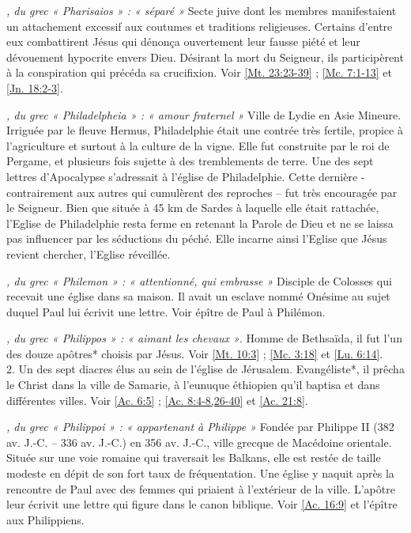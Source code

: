 \begin{multicols}{2}
\textit{, du grec « Pharisaios » : « séparé »}\newline
Secte juive dont les membres manifestaient un attachement excessif aux coutumes et traditions religieuses. Certains d'entre eux combattirent Jésus qui dénonça ouvertement leur fausse piété et leur dévouement hypocrite envers Dieu. Désirant la mort du Seigneur, ils participèrent à la conspiration qui précéda sa crucifixion. Voir \vref{Mt. 23:23-39} ; \vref{Mc. 7:1-13} et \vref{Jn. 18:2-3}.

\textit{, du grec « Philadelpheia » : « amour fraternel »}\newline
Ville de Lydie en Asie Mineure. Irriguée par le fleuve Hermus, Philadelphie était une contrée très fertile, propice à l'agriculture et surtout à la culture de la vigne. Elle fut construite par le roi de Pergame, et plusieurs fois sujette à des tremblements de terre. Une des sept lettres d'Apocalypse s'adressait à l'église de Philadelphie. Cette dernière - contrairement aux autres qui cumulèrent des reproches – fut très encouragée par le Seigneur. Bien que située à 45 km de Sardes à laquelle elle était rattachée, l'Eglise de Philadelphie resta ferme en retenant la Parole de Dieu et ne se laissa pas influencer par les séductions du péché. Elle incarne ainsi l'Eglise que Jésus revient chercher, l'Eglise réveillée.

\textit{, du grec « Philemon » : « attentionné, qui embrasse »}\newline
Disciple de Colosses qui recevait une église dans sa maison. Il avait un esclave nommé Onésime au sujet duquel Paul lui écrivit une lettre. Voir épître de Paul à Philémon.

\textit{, du grec « Philippos » : « aimant les chevaux »}. Homme de Bethsaïda, il fut l'un des douze apôtres* choisis par Jésus. Voir \vref{Mt. 10:3} ; \vref{Mc. 3:18} et \vref{Lu. 6:14}.
\\2. Un des sept diacres élus au sein de l'église de Jérusalem. Evangéliste*, il prêcha le Christ dans la ville de Samarie, à l'eunuque éthiopien qu'il baptisa et dans différentes villes. Voir \vref{Ac. 6:5} ; \vref{Ac. 8:4-8,26-40} et \vref{Ac. 21:8}.

\textit{, du grec « Philippoi » : « appartenant à Philippe »}\newline
Fondée par Philippe II (382 av. J.-C. – 336 av. J.-C.) en 356 av. J.-C., ville grecque de Macédoine orientale. Située sur une voie romaine qui traversait les Balkans, elle est restée de taille modeste en dépit de son fort taux de fréquentation. Une église y naquit après la rencontre de Paul avec des femmes qui priaient à l'extérieur de la ville. L'apôtre leur écrivit une lettre qui figure dans le canon biblique. Voir \vref{Ac. 16:9} et l'épître aux Philippiens.


\end{multicols}
